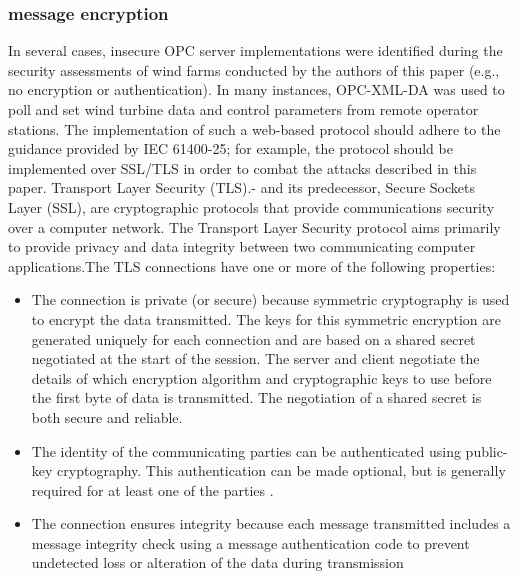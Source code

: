 \documentclass[twosided,a4,10pt]{article}
\begin{document}
\begin{multicols}{2}
\subsubsection{message encryption}
In several cases, insecure OPC server implementations were identified during the security assessments of wind farms conducted by the authors of this paper (e.g., no encryption or authentication). In many instances, OPC-XML-DA was used to poll and set wind turbine data and control parameters from remote operator stations. The implementation of such a web-based protocol should adhere to the guidance provided by IEC 61400-25; for example, the protocol should be implemented over SSL/TLS in order to combat the attacks described in this paper.
\newline Transport Layer Security (TLS).- and its predecessor, Secure Sockets Layer (SSL), are cryptographic protocols that provide communications security over a computer network. The Transport Layer Security protocol aims primarily to provide privacy and data integrity between two communicating computer applications.The TLS connections have one or more of the following properties:
\begin{itemize}
	\item The connection is private (or secure) because symmetric cryptography is used to encrypt the data transmitted. The keys for this symmetric encryption are generated uniquely for each connection and are based on a shared secret negotiated at the start of the session. The server and client negotiate the details of which encryption algorithm and cryptographic keys to use before the first byte of data is transmitted. The negotiation of a shared secret is both secure and reliable.
	\item The identity of the communicating parties can be authenticated using public-key cryptography. This authentication can be made optional, but is generally required for at least one of the parties .
	\item The connection ensures integrity because each message transmitted includes a message integrity check using a message authentication code to prevent undetected loss or alteration of the data during transmission
\end{itemize}






\end{multicols}
\end{document}
